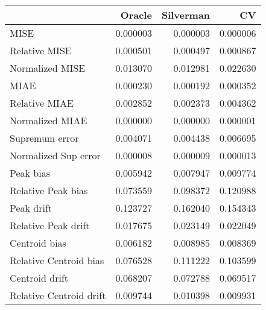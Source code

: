 \begin{tabular}{lrrr}
  \toprule
 & Oracle & Silverman & CV \\ 
  \midrule
MISE & 0.000003 & 0.000003 & 0.000006 \\ 
  Relative MISE & 0.000501 & 0.000497 & 0.000867 \\ 
  Normalized MISE & 0.013070 & 0.012981 & 0.022630 \\ 
  MIAE & 0.000230 & 0.000192 & 0.000352 \\ 
  Relative MIAE & 0.002852 & 0.002373 & 0.004362 \\ 
  Normalized MIAE & 0.000000 & 0.000000 & 0.000001 \\ 
  Supremum error & 0.004071 & 0.004438 & 0.006695 \\ 
  Normalized Sup error & 0.000008 & 0.000009 & 0.000013 \\ 
  Peak bias & 0.005942 & 0.007947 & 0.009774 \\ 
  Relative Peak bias & 0.073559 & 0.098372 & 0.120988 \\ 
  Peak drift & 0.123727 & 0.162040 & 0.154343 \\ 
  Relative Peak drift & 0.017675 & 0.023149 & 0.022049 \\ 
  Centroid bias & 0.006182 & 0.008985 & 0.008369 \\ 
  Relative Centroid bias & 0.076528 & 0.111222 & 0.103599 \\ 
  Centroid drift & 0.068207 & 0.072788 & 0.069517 \\ 
  Relative Centroid drift & 0.009744 & 0.010398 & 0.009931 \\ 
   \bottomrule
\end{tabular}
